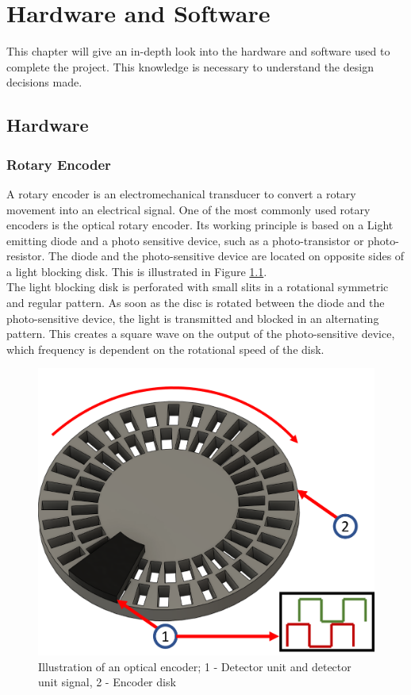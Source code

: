 \chapter{Hardware and Software}
\label{hardwareandsoftware}
 
This chapter will give an in-depth look into the hardware and software used to complete the project. This knowledge is necessary to understand the design decisions made.
 
\section{Hardware}
 
\subsection{Rotary Encoder}
A rotary encoder is an electromechanical transducer to convert a rotary movement into an electrical signal. One of the most commonly used rotary encoders is the optical rotary encoder.
Its working principle is based on a Light emitting diode and a photo sensitive device, such as a photo-transistor or photo-resistor. The diode and the photo-sensitive device are located on opposite sides of a light blocking disk. This is illustrated in Figure \ref{HardEnc}.\\
The light blocking disk is perforated with small slits in a rotational symmetric and regular pattern. As soon as the disc is rotated between the diode and the photo-sensitive device, the light is transmitted and blocked in an alternating pattern.
This creates a square wave on the output of the photo-sensitive device, which frequency is dependent on the rotational speed of the disk.\cite{MotionOptischerEncoder}
 
\begin{figure}
    \begin{center}
    \includegraphics[width=12cm]{Pictures/HardEnc.png}
    \caption[Illustration of an optical encoder]{Illustration of an optical encoder; 1 - Detector unit and detector unit signal, 2 - Encoder disk}
    \label{HardEnc}
    \end{center}
\end{figure}
 
